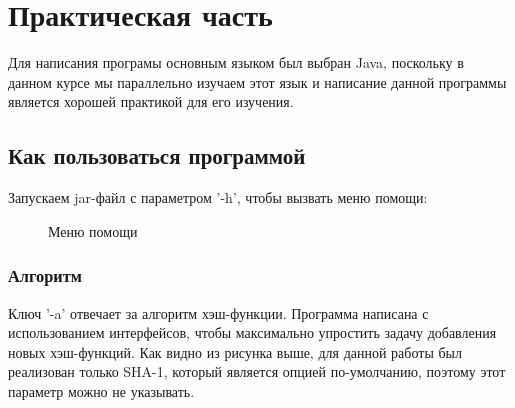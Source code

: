 \section{Практическая часть}

Для написания програмы основным языком был выбран Java, поскольку в данном курсе мы параллельно изучаем этот язык и написание данной программы
является хорошей практикой для его изучения.

\subsection{Как пользоваться программой}

Запускаем jar-файл с параметром '-h', чтобы вызвать меню помощи:
\begin{figure}[h!]
  \caption{Меню помощи}
\end{figure}

\subsubsection{Алгоритм}
Ключ '-a' отвечает за алгоритм хэш-функции. Программа написана с использованием интерфейсов, чтобы максимально упростить задачу добавления новых хэш-функций.
Как видно из рисунка выше, для данной работы был реализован только SHA-1, который является опцией по-умолчанию, поэтому этот параметр можно не указывать.


